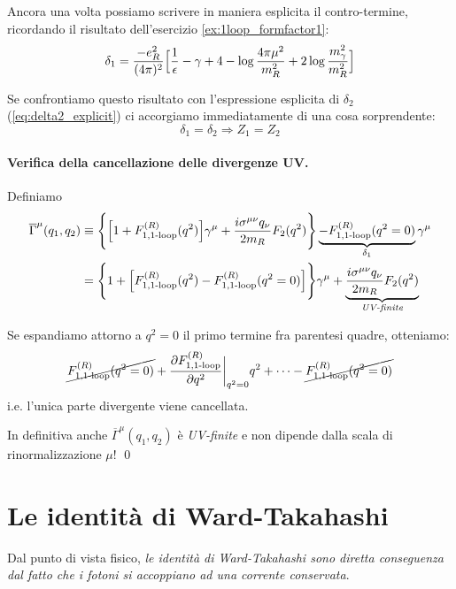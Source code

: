 \documentclass[../main.tex]{subfiles}
\begin{document}
Ancora una volta possiamo scrivere in maniera esplicita il contro-termine, ricordando il risultato dell'esercizio \ref{ex:1loop_formfactor1}:
\begin{equation}
    \delta_1 = \frac{-e_R^2}{(4\pi)^2}\Bigl[ \frac{1}{\epsilon} - \mathbb \gamma + 4 - \log{\frac{4\pi\mu^2}{m_R^2}} + 2\log{\frac{m_\gamma^2}{m_R^2}} \Bigr]
    \label{eq:delta1_explicit}
\end{equation}

Se confrontiamo questo risultato con l'espressione esplicita di $\delta_2$ (\ref{eq:delta2_explicit}) ci accorgiamo immediatamente di una cosa sorprendente:
\[
\boxed{\delta_1 = \delta_2 \Rightarrow Z_1 = Z_2}
\]

\paragraph{Verifica della cancellazione delle divergenze UV.}
Definiamo 
\begin{align*}
    \overline\Gamma^\mu(q_1,q_2) &\equiv \Biggl\{\Bigl[ 1 + F_{1, \text{1-loop}}^{(R)}(q^2) \Bigr]\gamma^\mu + \frac{i\sigma^{\mu\nu}q_\nu}{2m_R}F_2(q^2)\Biggr\} \underbrace{- F_{1, \text{1-loop}}^{(R)}(q^2=0)}_{\delta_1}\gamma^\mu\\
    &= \Biggl\{ 1 + \Bigl[F_{1, \text{1-loop}}^{(R)}(q^2) - F_{1, \text{1-loop}}^{(R)}(q^2=0) \Bigr]\Biggr\}\gamma^\mu + \underbrace{\frac{i\sigma^{\mu\nu}q_\nu}{2m_R}F_2(q^2)}_{\textit{UV-finite}}
\end{align*}

Se espandiamo attorno a $q^2 = 0$ il primo termine fra parentesi quadre, otteniamo:
\[
\cancel{F_{1, \text{1-loop}}^{(R)}(q^2=0)} + \frac{\partial F_{1, \text{1-loop}}^{(R)}}{\partial q^2}\bigg|_{q^2 = 0} q^2 + \cdots - \cancel{F_{1, \text{1-loop}}^{(R)}(q^2=0)}
\]
i.e. l'unica parte divergente viene cancellata.

In definitiva anche $\overline\Gamma^\mu(q_1,q_2)$ è \textit{UV-finite} e non dipende dalla scala di rinormalizzazione $\mu$! \qed

\section{Le identità di Ward-Takahashi}

Dal punto di vista fisico, \textit{le identità di Ward-Takahashi sono diretta conseguenza dal fatto che i fotoni si accoppiano ad una corrente conservata}.
\end{document}
